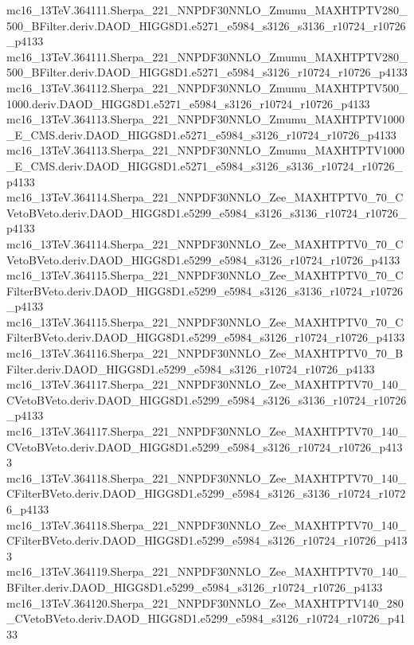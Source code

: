 mc16_13TeV.364111.Sherpa_221_NNPDF30NNLO_Zmumu_MAXHTPTV280_500_BFilter.deriv.DAOD_HIGG8D1.e5271_e5984_s3126_s3136_r10724_r10726_p4133 \\
mc16_13TeV.364111.Sherpa_221_NNPDF30NNLO_Zmumu_MAXHTPTV280_500_BFilter.deriv.DAOD_HIGG8D1.e5271_e5984_s3126_r10724_r10726_p4133 \\
mc16_13TeV.364112.Sherpa_221_NNPDF30NNLO_Zmumu_MAXHTPTV500_1000.deriv.DAOD_HIGG8D1.e5271_e5984_s3126_r10724_r10726_p4133 \\
mc16_13TeV.364113.Sherpa_221_NNPDF30NNLO_Zmumu_MAXHTPTV1000_E_CMS.deriv.DAOD_HIGG8D1.e5271_e5984_s3126_r10724_r10726_p4133 \\
mc16_13TeV.364113.Sherpa_221_NNPDF30NNLO_Zmumu_MAXHTPTV1000_E_CMS.deriv.DAOD_HIGG8D1.e5271_e5984_s3126_s3136_r10724_r10726_p4133 \\
mc16_13TeV.364114.Sherpa_221_NNPDF30NNLO_Zee_MAXHTPTV0_70_CVetoBVeto.deriv.DAOD_HIGG8D1.e5299_e5984_s3126_s3136_r10724_r10726_p4133 \\
mc16_13TeV.364114.Sherpa_221_NNPDF30NNLO_Zee_MAXHTPTV0_70_CVetoBVeto.deriv.DAOD_HIGG8D1.e5299_e5984_s3126_r10724_r10726_p4133 \\
mc16_13TeV.364115.Sherpa_221_NNPDF30NNLO_Zee_MAXHTPTV0_70_CFilterBVeto.deriv.DAOD_HIGG8D1.e5299_e5984_s3126_s3136_r10724_r10726_p4133 \\
mc16_13TeV.364115.Sherpa_221_NNPDF30NNLO_Zee_MAXHTPTV0_70_CFilterBVeto.deriv.DAOD_HIGG8D1.e5299_e5984_s3126_r10724_r10726_p4133 \\
mc16_13TeV.364116.Sherpa_221_NNPDF30NNLO_Zee_MAXHTPTV0_70_BFilter.deriv.DAOD_HIGG8D1.e5299_e5984_s3126_r10724_r10726_p4133 \\
mc16_13TeV.364117.Sherpa_221_NNPDF30NNLO_Zee_MAXHTPTV70_140_CVetoBVeto.deriv.DAOD_HIGG8D1.e5299_e5984_s3126_s3136_r10724_r10726_p4133 \\
mc16_13TeV.364117.Sherpa_221_NNPDF30NNLO_Zee_MAXHTPTV70_140_CVetoBVeto.deriv.DAOD_HIGG8D1.e5299_e5984_s3126_r10724_r10726_p4133 \\
mc16_13TeV.364118.Sherpa_221_NNPDF30NNLO_Zee_MAXHTPTV70_140_CFilterBVeto.deriv.DAOD_HIGG8D1.e5299_e5984_s3126_s3136_r10724_r10726_p4133 \\
mc16_13TeV.364118.Sherpa_221_NNPDF30NNLO_Zee_MAXHTPTV70_140_CFilterBVeto.deriv.DAOD_HIGG8D1.e5299_e5984_s3126_r10724_r10726_p4133 \\
mc16_13TeV.364119.Sherpa_221_NNPDF30NNLO_Zee_MAXHTPTV70_140_BFilter.deriv.DAOD_HIGG8D1.e5299_e5984_s3126_r10724_r10726_p4133 \\
mc16_13TeV.364120.Sherpa_221_NNPDF30NNLO_Zee_MAXHTPTV140_280_CVetoBVeto.deriv.DAOD_HIGG8D1.e5299_e5984_s3126_r10724_r10726_p4133 \\
